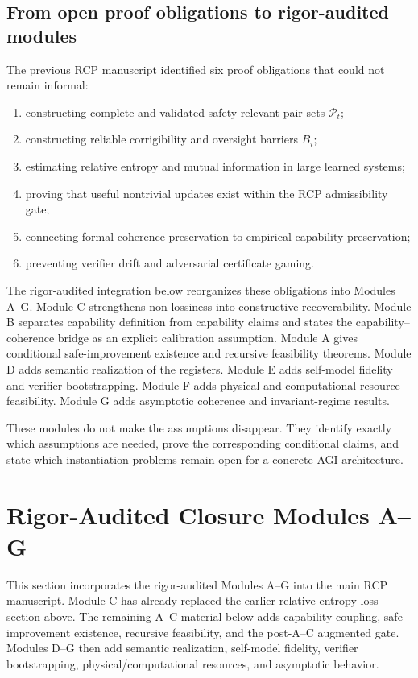 \documentclass[11pt]{article}
\newcommand{\Pcal}{\mathcal{P}}
\newcommand{\1}{\mathbf{1}}
\begin{document}
\subsection{From open proof obligations to rigor-audited modules}
\label{subsec:six_open_obligations}

The previous RCP manuscript identified six proof obligations that could not remain informal:
\begin{enumerate}
    \item constructing complete and validated safety-relevant pair sets \(\Pcal_t\);
    \item constructing reliable corrigibility and oversight barriers \(B_i\);
    \item estimating relative entropy and mutual information in large learned systems;
    \item proving that useful nontrivial updates exist within the RCP admissibility gate;
    \item connecting formal coherence preservation to empirical capability preservation;
    \item preventing verifier drift and adversarial certificate gaming.
\end{enumerate}

The rigor-audited integration below reorganizes these obligations into Modules A--G.  Module C strengthens non-lossiness into constructive recoverability.  Module B separates capability definition from capability claims and states the capability--coherence bridge as an explicit calibration assumption.  Module A gives conditional safe-improvement existence and recursive feasibility theorems.  Module D adds semantic realization of the registers.  Module E adds self-model fidelity and verifier bootstrapping.  Module F adds physical and computational resource feasibility.  Module G adds asymptotic coherence and invariant-regime results.

These modules do not make the assumptions disappear.  They identify exactly which assumptions are needed, prove the corresponding conditional claims, and state which instantiation problems remain open for a concrete AGI architecture.


\section{Rigor-Audited Closure Modules A--G}
\label{sec:closure_modules}

This section incorporates the rigor-audited Modules A--G into the main RCP manuscript.  Module C has already replaced the earlier relative-entropy loss section above.  The remaining A--C material below adds capability coupling, safe-improvement existence, recursive feasibility, and the post-A--C augmented gate.  Modules D--G then add semantic realization, self-model fidelity, verifier bootstrapping, physical/computational resources, and asymptotic behavior.
\end{document}
